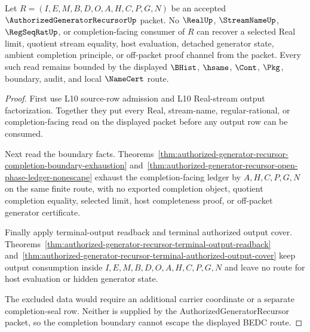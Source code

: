 \begin{theorem}
\label{thm:authorized-generator-recursor-l10-completion-boundary-nonescape}
Let $R=(I,E,M,B,D,O,A,H,C,P,G,N)$ be an accepted $\AuthorizedGeneratorRecursorUp$ packet. No $\RealUp$, $\StreamNameUp$, $\RegSeqRatUp$, or completion-facing consumer of $R$ can recover a selected Real limit, quotient stream equality, host evaluation, detached generator state, ambient completion principle, or off-packet proof channel from the packet. Every such read remains bounded by the displayed $\BHist$, $\hsame$, $\Cont$, $\Pkg$, boundary, audit, and local $\NameCert$ route.
\end{theorem}
\begin{proof}
First use L10 source-row admission and L10 Real-stream output factorization. Together they put every Real, stream-name, regular-rational, or completion-facing read on the displayed packet before any output row can be consumed.

Next read the boundary facts. Theorems~\ref{thm:authorized-generator-recursor-completion-boundary-exhaustion} and~\ref{thm:authorized-generator-recursor-open-phase-ledger-nonescape} exhaust the completion-facing ledger by $A,H,C,P,G,N$ on the same finite route, with no exported completion object, quotient completion equality, selected limit, host completeness proof, or off-packet generator certificate.

Finally apply terminal-output readback and terminal authorized output cover. Theorems~\ref{thm:authorized-generator-recursor-terminal-output-readback} and~\ref{thm:authorized-generator-recursor-terminal-authorized-output-cover} keep output consumption inside $I,E,M,B,D,O,A,H,C,P,G,N$ and leave no route for host evaluation or hidden generator state.

The excluded data would require an additional carrier coordinate or a separate completion-seal row. Neither is supplied by the AuthorizedGeneratorRecursor packet, so the completion boundary cannot escape the displayed BEDC route.
\end{proof}

